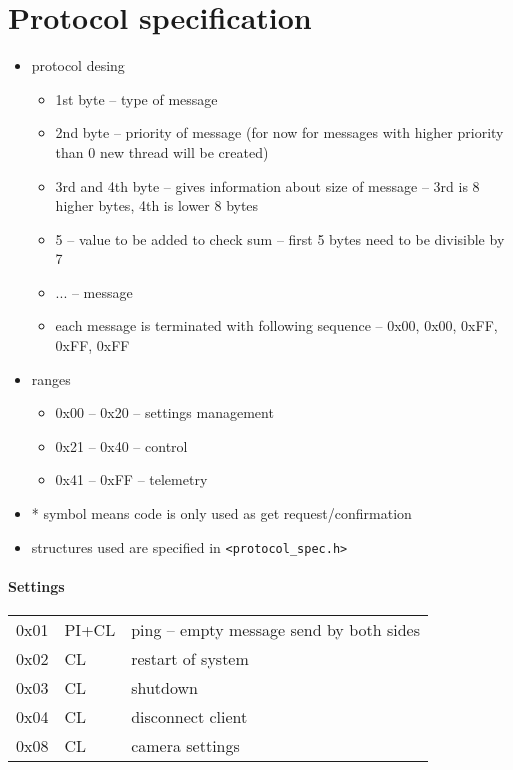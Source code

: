 \documentclass[a4paper,12pt]{report}
\begin{document}
\pagestyle{plain}


\chapter{Protocol specification}

\begin{itemize}
  \item protocol desing
    \begin{itemize}
      \item 1st byte -- type of message
      \item 2nd byte -- priority of message (for now for messages with higher priority than 0 new thread will be created)
      \item 3rd and 4th byte -- gives information about size of message -- 3rd is 8 higher bytes, 4th is lower 8 bytes
      \item 5 -- value to be added to check sum -- first 5 bytes need to be divisible by 7
      \item ... -- message
      \item each message is terminated with following sequence -- 0x00, 0x00, 0xFF, 0xFF, 0xFF
    \end{itemize}
  \item ranges
    \begin{itemize}
      \item 0x00 -- 0x20 -- settings management
      \item 0x21 -- 0x40 -- control
      \item 0x41 -- 0xFF -- telemetry
    \end{itemize}
	\item * symbol means code is only used as get request/confirmation
	\item structures used are specified in \verb|<protocol_spec.h>|
\end{itemize}


\subsubsection{Settings}

\begin{center}
  \begin{longtable}{| m{1cm} | m{1.5cm} | m{13cm} | }
    \hline
    0x01 & PI+CL & ping -- empty message send by both sides \\
    0x02 & CL    & restart of system                        \\
    0x03 & CL    & shutdown                                 \\
    0x04 & CL    & disconnect client                        \\
    0x08 & CL    & camera settings                          \\

    \hline
  \end{longtable}
\end{center}
\end{document}
